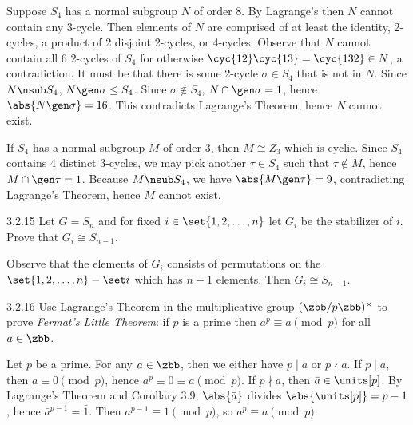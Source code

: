 \begin{sol}
    Suppose $S_4$ has a normal subgroup $N$ of order 8.
	By Lagrange's then $N$ cannot contain any 3-cycle.
	Then elements of $N$ are comprised of at least the identity, 2-cycles, a product of 2 disjoint 2-cycles, or 4-cycles.
	Observe that $N$ cannot contain all 6 2-cycles of $S_4$ for otherwise $\cyc{1 2}\cyc{1 3} = \cyc{1 3 2} \in N$, a contradiction.
	It must be that there is some 2-cycle $\sigma \in S_4$ that is not in $N$.
	Since $N \nsub S_4$, $N \gen\sigma \leq S_4$.
	Since $\sigma \notin S_4$, $N \cap \gen\sigma = 1$, hence $\abs{N \gen\sigma} = 16$.
	This contradicts Lagrange's Theorem, hence $N$ cannot exist.

    If $S_4$ has a normal subgroup $M$ of order 3, then $M \cong Z_3$ which is cyclic.
	Since $S_4$ contains 4 distinct 3-cycles, we may pick another $\tau \in S_4$ such that $\tau \notin M$, hence $M \cap \gen\tau = 1$.
	Because $M \nsub S_4$, we have $\abs{M \gen\tau} = 9$, contradicting Lagrange's Theorem, hence $M$ cannot exist.
\end{sol}

\begin{exercise}{3.2.15}
    Let $G = S_n$ and for fixed $i \in \set{1, 2, \dots, n}$ let $G_i$ be the stabilizer of $i$.
	Prove that $G_i \cong S_{n-1}$.
\end{exercise}

\begin{sol}
    Observe that the elements of $G_i$ consists of permutations on the $\set{1, 2, \ldots, n} - \set i$ which has $n - 1$ elements.
	Then $G_i \cong S_{n - 1}$.
\end{sol}

\begin{exercise}{3.2.16}
    Use Lagrange's Theorem in the multiplicative group $(\zbb/p\zbb)^\times$ to prove \emph{Fermat's Little Theorem}: if $p$ is a prime then $a^p \equiv a \pmod p$ for all $a \in \zbb$.
\end{exercise}

\begin{sol}
    Let $p$ be a prime.
	For any $a \in \zbb$, then we either have $p \mid a$ or $p \nmid a$.
	If $p \mid a$, then $a \equiv 0 \pmod p$, hence $a^p \equiv 0 \equiv a \pmod p$.
	If $p \nmid a$, then $\bar a \in \units[p]$.
	By Lagrange's Theorem and Corollary 3.9, $\abs{\bar a}$ divides $\abs{\units[p]} = p - 1$, hence $\bar a^{p - 1} = \bar 1$.
	Then $a^{p - 1} \equiv 1 \pmod p$, so $a^p \equiv a \pmod p$.
\end{sol}

